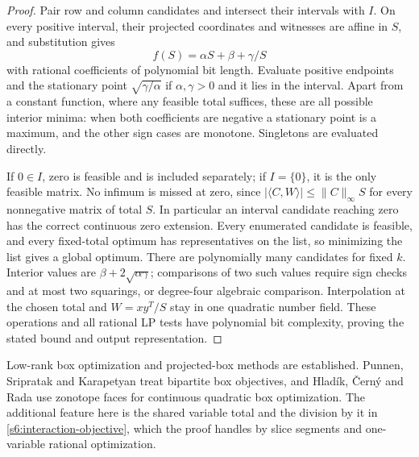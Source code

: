 \begin{proof}
Pair row and column candidates and intersect their intervals with $I$.
On every positive interval, their projected coordinates and witnesses
are affine in $S$, and substitution gives
\begin{equation}
 f(S)=\alpha S+\beta+\gamma/S\label{s6:fractional-piece}
\end{equation}
with rational coefficients of polynomial bit length. Evaluate positive
endpoints and the stationary point $\sqrt{\gamma/\alpha}$ if
$\alpha,\gamma>0$ and it lies in the interval. Apart from a constant
function, where any feasible total suffices, these are all possible
interior minima: when both coefficients are negative a stationary
point is a maximum, and the other sign cases are monotone. Singletons are
evaluated directly.

If $0\in I$, zero is feasible and is included separately; if $I=\{0\}$,
it is the only feasible matrix. No infimum is missed at zero, since
$|\langle C,W\rangle|\le\|C\|_\infty S$ for every nonnegative
matrix of total $S$. In particular an interval candidate reaching zero
has the correct continuous zero extension. Every enumerated candidate
is feasible, and every fixed-total optimum has representatives on the
list, so minimizing the list gives a global optimum.
There are polynomially many candidates for fixed $k$. Interior values
are $\beta+2\sqrt{\alpha\gamma}$; comparisons of two such values
require sign checks and at most two squarings, or degree-four algebraic
comparison. Interpolation at the chosen total and $W=xy^T/S$ stay in
one quadratic number field. These operations and all rational LP tests
have polynomial bit complexity, proving the stated bound and output
representation.
\end{proof}

Low-rank box optimization and projected-box methods are established.
Punnen, Sripratak and Karapetyan
\cite[Sections~3.2--3.3]{s6:punnen2015} treat bipartite box objectives,
and Hlad\'ik, \v{C}ern\'y and Rada \cite{s6:hladik2021} use zonotope faces
for continuous quadratic box optimization. The additional feature here
is the shared variable total and the division by it in
\eqref{s6:interaction-objective}, which the proof handles by slice segments
and one-variable rational optimization.

